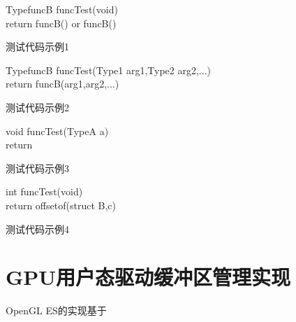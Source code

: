\begin{minipage}{0.45\textwidth}
  \begin{algorithm}[H]
    \SetAlgoLined
    TypefuncB funcTest(void){\\
      return funcB()\;
        or \;
      funcB()\;
    }
    \caption{测试代码示例1}
    \label{algo:algorithm2}
  \end{algorithm}
\end{minipage}
\hfill
\begin{minipage}{0.45\textwidth}
  \begin{algorithm}[H]
    \SetAlgoLined
    TypefuncB funcTest(Type1 arg1,Type2 arg2,...){\\
      return funcB(arg1,arg2,...)\;
    }
    \caption{测试代码示例2}
    \label{algo:algorithm3}
  \end{algorithm}
\end{minipage}

\begin{minipage}{0.45\textwidth}
  \begin{algorithm}[H]
    \SetAlgoLined
    void funcTest(TypeA a){\\
      return \;
    }
    \caption{测试代码示例3}
    \label{algo:algorithm4}
  \end{algorithm}
\end{minipage}
\hfill
\begin{minipage}{0.45\textwidth}
  \begin{algorithm}[H]
    \SetAlgoLined
    int funcTest(void){\\
      return offsetof(struct B,c) \;
    }
    \caption{测试代码示例4}
    \label{algo:algorithm5}
  \end{algorithm}
\end{minipage}


\section{GPU用户态驱动缓冲区管理实现}
OpenGL ES的实现基于

